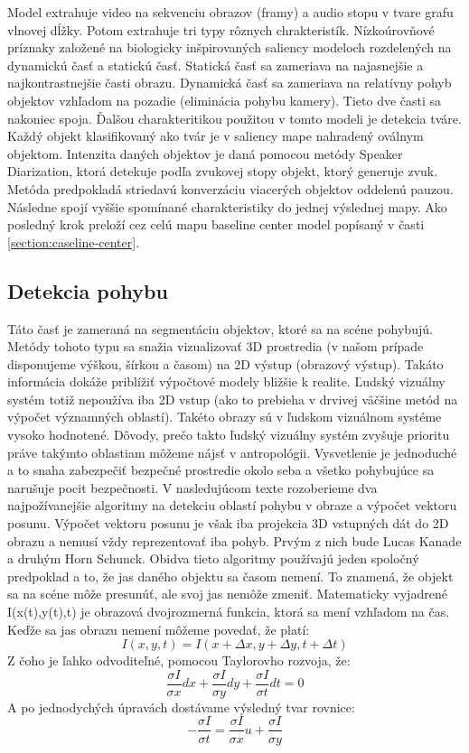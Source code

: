 Model extrahuje video na sekvenciu obrazov (framy) a audio stopu v tvare grafu vlnovej dĺžky.
Potom extrahuje tri typy rôznych chrakteristík.
Nízkoúrovňové príznaky založené na biologicky inšpirovaných saliency modeloch rozdelených na dynamickú časť a statickú časť.
Statická časť sa zameriava na najasnejšie a najkontrastnejšie časti obrazu.
Dynamická časť sa zameriava na relatívny pohyb objektov vzhľadom na pozadie (eliminácia pohybu kamery).
Tieto dve časti sa nakoniec spoja.
Ďalšou charakteritikou použitou v tomto modeli je detekcia tváre.
Každý objekt klasifikovaný ako tvár je v saliency mape nahradený oválnym objektom.
Intenzita daných objektov je daná pomocou metódy Speaker Diarization\cite{sound-courot-2}, ktorá detekuje podľa zvukovej stopy objekt, ktorý generuje zvuk.
Metóda predpokladá striedavú konverzáciu viacerých objektov oddelenú pauzou.
Následne spojí vyššie spomínané charakteristiky do jednej výslednej mapy.
Ako posledný krok preloží cez celú mapu baseline center model popísaný v časti \ref{section:caseline-center}.

\subsection{Detekcia pohybu}
Táto časť je zameraná na segmentáciu objektov, ktoré sa na scéne pohybujú.
Metódy tohoto typu sa snažia vizualizovať 3D prostredia (v našom prípade disponujeme výškou, šírkou a časom) na 2D výstup (obrazový výstup).
Takáto informácia dokáže priblížiť výpočtové modely bližšie k realite.
Ľudský vizuálny systém totiž nepoužíva iba 2D vstup (ako to prebieha v drvivej väčšine metód na výpočet významných oblastí).
Takéto obrazy sú v ľudskom vizuálnom systéme vysoko hodnotené.
Dôvody, prečo takto ľudský vizuálny systém zvyšuje prioritu práve takýmto oblastiam môžeme nájsť v antropológii.
Vysvetlenie je jednoduché a to snaha zabezpečiť bezpečné prostredie okolo seba a všetko pohybujúce sa narušuje pocit bezpečnosti.
V nasledujúcom texte rozoberieme dva najpožívanejšie algoritmy na detekciu oblastí pohybu v obraze a výpočet vektoru posunu.
Výpočet vektoru posunu je však iba projekcia 3D vstupných dát do 2D obrazu a nemusí vždy reprezentovať iba pohyb.
Prvým z nich bude Lucas Kanade\cite{lucas-kanade} a druhým Horn Schunck\cite{hs-original}.
Obidva tieto algoritmy používajú jeden spoločný predpoklad a to, že jas daného objektu sa časom nemení.
To znamená, že objekt sa na scéne môže presunúť, ale svoj jas nemôže zmeniť.
Matematicky vyjadrené I(x(t),y(t),t) je obrazová dvojrozmerná funkcia, ktorá sa mení vzhľadom na čas.
Keďže sa jas obrazu nemení môžeme povedať, že platí:
\begin{equation}
  I(x,y,t) = I(x + \Delta x ,y + \Delta y, t + \Delta t) 
\end{equation}
Z čoho je ľahko odvoditeľné, pomocou Taylorovho rozvoja, že:
\begin{equation}  
  \frac{\sigma I}{\sigma x}dx + \frac{\sigma I}{\sigma y}dy + \frac{\sigma I}{\sigma t}dt = 0
\end{equation}
A po jednodychých úpravách dostávame výsledný tvar rovnice:
\begin{equation}
- \frac{\sigma I}{\sigma t} = \frac{\sigma I}{\sigma x}u + \frac{\sigma I}{\sigma y}
\end{equation}

